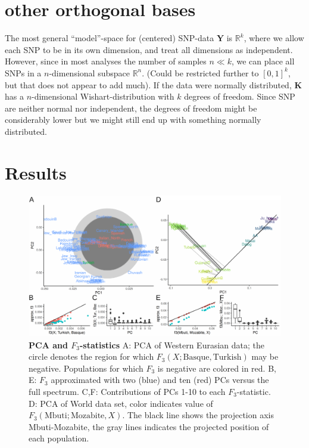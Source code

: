 \documentclass[10pt,a4paper]{article}
\newcommand{\MY}{\mathbf{Y}} %
\newcommand{\MK}{\mathbf{K}} %
\begin{document}
\section{other orthogonal bases}
The most general ``model''-space for (centered) SNP-data $\MY$ is $\mathbb{R}^k$, where we allow each SNP to be in its own dimension, and treat all dimensions as independent. However, since in most analyses the number of samples $n \ll k$, we can place all SNPs in a $n$-dimensional subspace $\mathbb{R}^n$. (Could be restricted further to $[0,1]^k$, but that does not appear to add much).
If the data were normally distributed, $\MK$ has a $n$-dimensional Wishart-distribution with $k$ degrees of freedom. Since SNP are neither normal nor independent, the degrees of freedom might be considerably lower but we might still end up with something normally distributed.



\section{Results}
\begin{figure}[!ht]
	\includegraphics[width=\textwidth]{figures/fig_f3_data.pdf}
	\caption{\textbf{PCA and $F_3$-statistics} A: PCA of Western Eurasian data; the circle denotes the region for which $F_3(X; \text{Basque}, \text{Turkish})$ may be negative. Populations for which $F_3$ is negative are colored in red. B, E: $F_3$ approximated with two (blue) and ten (red) PCs versus the full spectrum. C,F: Contributions of PCs 1-10 to each $F_3$-statistic. D: PCA of World data set, color indicates value of $F_3(\text{Mbuti}; \text{Mozabite}, X)$. The black line shows the projection axis Mbuti-Mozabite, the gray lines indicates the projected position of each population. }
	\label{fig:f3}
\end{figure}
\end{document}
